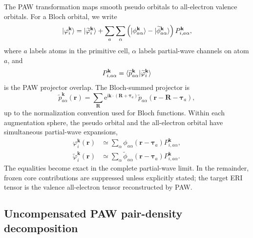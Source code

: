 \documentclass[aps,prb,reprint,superscriptaddress,longbibliography,nofootinbib]{revtex4-2}
\newcommand{\br}{\mathbf r}
\newcommand{\bR}{\mathbf R}
\newcommand{\bk}{\mathbf k}
\newcommand{\btau}{\boldsymbol\tau}
\newcommand{\ee}{\mathrm e}
\newcommand{\ii}{\mathrm i}
\begin{document}
The PAW transformation maps smooth pseudo orbitals to all-electron valence orbitals.  For a Bloch orbital, we write
\begin{equation}
\ket{\varphi_i^{\bk}}
=\ket{\widetilde\varphi_i^{\bk}}
+
\sum_a\sum_\alpha
\left(
\ket{\phi_{a\alpha}^{\bk}}-
\ket{\widetilde\phi_{a\alpha}^{\bk}}
\right)
P_{i,a\alpha}^{\bk},
\label{eq:paw-transform}
\end{equation}
where \(a\) labels atoms in the primitive cell, \(\alpha\) labels partial-wave channels on atom \(a\), and
\begin{equation}
P_{i,a\alpha}^{\bk}
=
\braket{\widetilde p_{a\alpha}^{\bk}|\widetilde\varphi_i^{\bk}}
\label{eq:projector-overlap}
\end{equation}
is the PAW projector overlap.  The Bloch-summed projector is
\begin{equation}
\widetilde p_{a\alpha}^{\bk}(\br)
=
\sum_{\bR}
\ee^{\ii\bk\cdot(\bR+\btau_a)}
\widetilde p_{a\alpha}(\br-\bR-\btau_a),
\label{eq:bloch-projector}
\end{equation}
up to the normalization convention used for Bloch functions.  Within each augmentation sphere, the pseudo orbital and the all-electron orbital have simultaneous partial-wave expansions,
\begin{subequations}
\begin{align}
\varphi_i^{\bk}(\br)
&\simeq
\sum_\alpha \phi_{a\alpha}(\br-\btau_a)P_{i,a\alpha}^{\bk},
\label{eq:ae-inside}\\
\widetilde\varphi_i^{\bk}(\br)
&\simeq
\sum_\alpha \widetilde\phi_{a\alpha}(\br-\btau_a)P_{i,a\alpha}^{\bk}.
\label{eq:pseudo-inside}
\end{align}
\end{subequations}
The equalities become exact in the complete partial-wave limit.  In the remainder, frozen core contributions are suppressed unless explicitly stated; the target ERI tensor is the valence all-electron tensor reconstructed by PAW.

\subsection{Uncompensated PAW pair-density decomposition}
\end{document}
